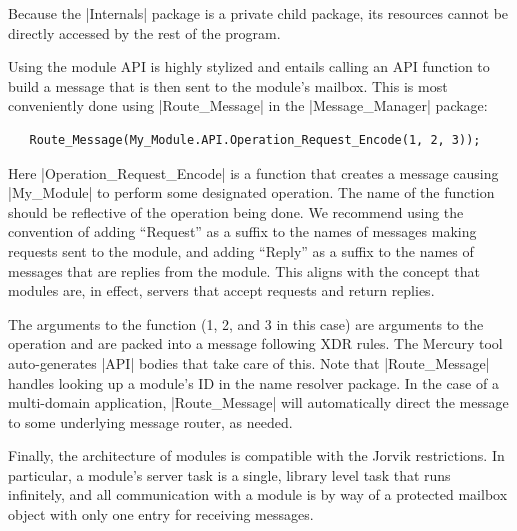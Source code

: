 Because the |Internals| package is a private child package, its resources cannot be directly
accessed by the rest of the program.

Using the module API is highly stylized and entails calling an API function to build a message
that is then sent to the module's mailbox. This is most conveniently done using |Route_Message|
in the |Message_Manager| package:

\begin{lstlisting}
   Route_Message(My_Module.API.Operation_Request_Encode(1, 2, 3));
\end{lstlisting}

Here |Operation_Request_Encode| is a function that creates a message causing |My_Module| to
perform some designated operation. The name of the function should be reflective of the
operation being done. We recommend using the convention of adding ``Request'' as a suffix to the
names of messages making requests sent to the module, and adding ``Reply'' as a suffix to the
names of messages that are replies from the module. This aligns with the concept that modules
are, in effect, servers that accept requests and return replies.

The arguments to the function (1, 2, and 3 in this case) are arguments to the operation and are
packed into a message following XDR rules. The Mercury tool auto-generates |API| bodies that
take care of this. Note that |Route_Message| handles looking up a module's ID in the name
resolver package. In the case of a multi-domain application, |Route_Message| will automatically
direct the message to some underlying message router, as needed.

Finally, the architecture of modules is compatible with the Jorvik restrictions. In particular,
a module's server task is a single, library level task that runs infinitely, and all
communication with a module is by way of a protected mailbox object with only one entry for
receiving messages.

